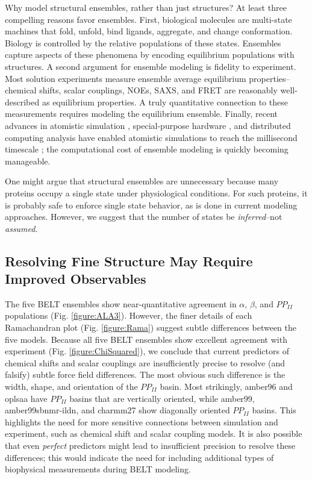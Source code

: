 \documentclass[11pt,titlepage]{article}
\begin{document}
Why model structural ensembles, rather than just structures?  At least three compelling reasons favor ensembles.  First, biological molecules are multi-state machines that fold, unfold, bind ligands, aggregate, and change conformation.  Biology is controlled by the relative populations of these states.  Ensembles capture aspects of these phenomena by encoding equilibrium populations with structures.  A second argument for ensemble modeling is fidelity to experiment.  Most solution experiments measure ensemble average equilibrium properties--chemical shifts, scalar couplings, NOEs, SAXS, and FRET are reasonably well-described as equilibrium properties.  A truly quantitative connection to these measurements requires modeling the equilibrium ensemble.  Finally, recent advances in atomistic simulation  \citep{hess2008, pronk2013gromacs, eastman2012openmm, eastman2010openmm}, special-purpose hardware  \citep{Shaw2008}, and distributed computing analysis  \citep{emma, msmb2} have enabled atomistic simulations to 
reach 
the millisecond timescale  \citep{voelz2010, bowman2011atomistic, shaw2010, Shaw2011}; the computational cost of ensemble modeling is quickly becoming manageable.

One might argue that structural ensembles are unnecessary because many proteins occupy a single state under physiological conditions.  For such proteins, it is probably safe to enforce single state behavior, as is done in current modeling approaches. However, we suggest that the number of states be \emph{inferred}--not \emph{assumed}.  


\subsection*{Resolving Fine Structure May Require Improved Observables}

The five BELT ensembles show near-quantitative agreement in $\alpha$, $\beta$, and $PP_{II}$ populations (Fig. \ref{figure:ALA3}).  However, the finer details of each Ramachandran plot (Fig. \ref{figure:Rama}) suggest subtle differences between the 
five models.  Because all five BELT ensembles show excellent agreement with experiment (Fig. \ref{figure:ChiSquared}), we conclude that current predictors of chemical shifts and scalar couplings are insufficiently precise to resolve (and falsify) subtle force field differences.  The most obvious such difference is the width, shape, and orientation of the $PP_{II}$ basin.  Most strikingly, amber96 and oplsaa have $PP_{II}$ basins that are vertically oriented, while amber99, amber99sbnmr-ildn, and charmm27 show diagonally oriented $PP_{II}$ basins.  This highlights the need for more sensitive connections between simulation and experiment, such as chemical shift and scalar coupling models.  It is also possible that even \emph{perfect} predictors might lead to insufficient precision to resolve these differences; this would indicate the need for including additional types of biophysical measurements during BELT modeling.
\end{document}
